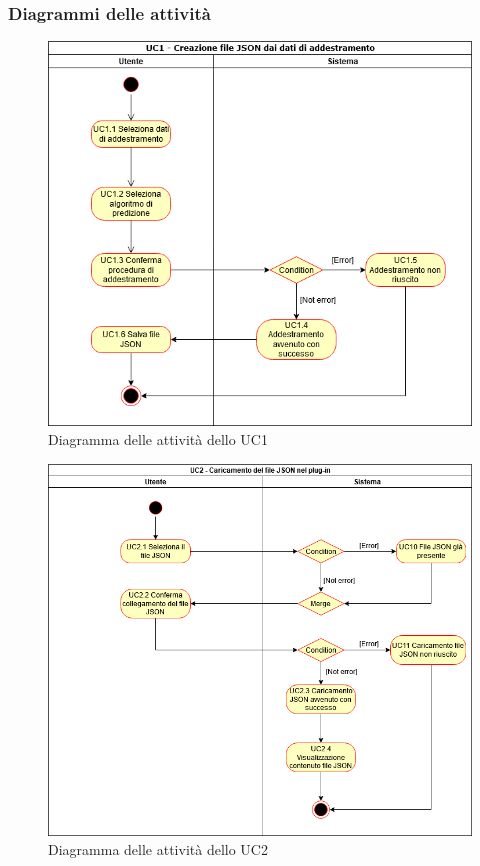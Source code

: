 \subsubsection{Diagrammi delle attività}
\begin{figure}[H]
\centering
\includegraphics[scale=0.6]{../../Diagrams/Activity_diagrams/uc1.png}
\caption{Diagramma delle attività dello UC1}
\end{figure}
\begin{figure}[H]
\centering
\includegraphics[scale=0.6]{../../Diagrams/Activity_diagrams/uc2.png}
\caption{Diagramma delle attività dello UC2}
\end{figure}

